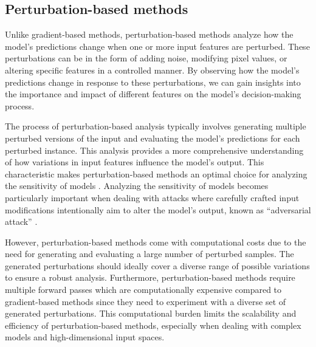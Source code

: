 \subsection{Perturbation-based methods}
\label{subsec:perturbationMethods}
Unlike gradient-based methods, perturbation-based methods analyze how the model's predictions change when one or more input features are perturbed. These perturbations can be in the form of adding noise, modifying pixel values, or altering specific features in a controlled manner. By observing how the model's predictions change in response to these perturbations, we can gain insights into the importance and impact of different features on the model's decision-making process.

The process of perturbation-based analysis typically involves generating multiple perturbed versions of the input and evaluating the model's predictions for each perturbed instance. This analysis provides a more comprehensive understanding of how variations in input features influence the model's output. This characteristic makes perturbation-based methods an optimal choice for analyzing the sensitivity of models \cite{gradientBased}. Analyzing the sensitivity of models becomes particularly important when dealing with attacks where carefully crafted input modifications intentionally aim to alter the model's output, known as ``adversarial attack'' \cite{adversarialAttacks}.  

However, perturbation-based methods come with computational costs due to the need for generating and evaluating a large number of perturbed samples. The generated perturbations should ideally cover a diverse range of possible variations to ensure a robust analysis. Furthermore, perturbation-based methods require multiple forward passes which are computationally expensive compared to gradient-based methods since they need to experiment with a diverse set of generated perturbations. This computational burden limits the scalability and efficiency of perturbation-based methods, especially when dealing with complex models and high-dimensional input spaces.

